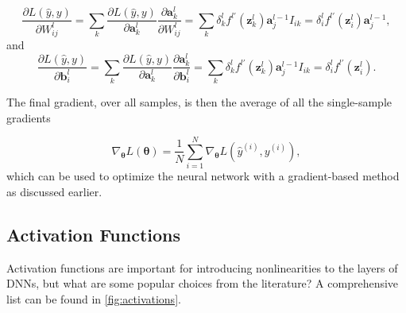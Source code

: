 \begin{equation}\label{eq:derivweights}
    \frac{\partial L(\hat{y}, y)}{\partial W^l_{ij}} = 
    \sum_k \frac{\partial L(\hat{y}, y)}{\partial \boldsymbol{a}^{l}_k} \frac{\partial \boldsymbol{a}^{l}_k}{\partial W^l_{ij}} = 
    \sum_k \delta^{l}_k f^{l\prime}(\boldsymbol{z}^{l}_k)\boldsymbol{a}^{l-1}_j I_{ik}=
    \delta^{l}_i f^{l\prime}(\boldsymbol{z}^l_i) \boldsymbol{a}^{l-1}_j,
\end{equation}
and
\begin{equation}\label{eq:derivbiases}
    \frac{\partial L(\hat{y}, y)}{\partial \boldsymbol{b}^l_{i}} = 
    \sum_k \frac{\partial L(\hat{y}, y)}{\partial \boldsymbol{a}^{l}_k} \frac{\partial \boldsymbol{a}^{l}_k}{\partial \boldsymbol{b}^l_{i}} = 
    \sum_k \delta^{l}_k f^{l\prime}(\boldsymbol{z}^{l}_k)\boldsymbol{a}^{l-1}_j I_{ik}=
    \delta^{l}_i f^{l\prime}(\boldsymbol{z}^l_i).
\end{equation}

The final gradient, over all samples, is then the average of all the single-sample gradients

\begin{equation}\label{eq:averageGradient}
    \nabla_{\boldsymbol{\theta}} L(\boldsymbol{\theta}) = \frac{1}{N}\sum_{i=1}^N \nabla_{\boldsymbol{\theta}} L(\hat{y}^{(i)}, y^{(i)}),
\end{equation}
which can be used to optimize the neural network with a gradient-based method as discussed earlier.

\subsection{Activation Functions}\label{sec:Activation Functions}

Activation functions are important for introducing nonlinearities to the layers of DNNs, but what are some popular choices from the literature? A comprehensive list can be found in \autoref{fig:activations}.


